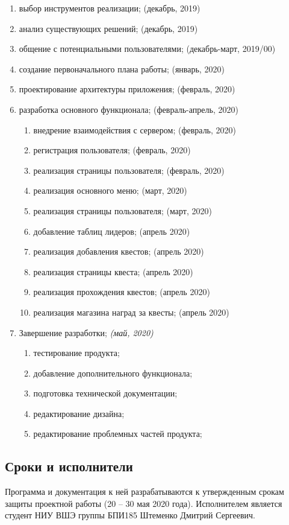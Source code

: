 \begin{enumerate}[I.]
\begin{enumerate}[1.]
		\begin{enumerate}[1.]
			\item выбор инструментов реализации; (декабрь, 2019)
			\item анализ существующих решений; (декабрь, 2019)
			\item общение с потенциальными пользователями; (декабрь-март, 2019/00)
			\item создание первоначального плана работы; (январь, 2020)
			\item проектирование архитектуры приложения; (февраль, 2020)
			\item разработка основного функционала; (февраль-апрель, 2020)
			\begin{enumerate}
				\item внедрение взаимодействия с сервером; (февраль, 2020)
				\item регистрация пользователя; (февраль, 2020)
				\item реализация страницы пользователя; (февраль, 2020)
				\item реализация основного меню; (март, 2020)
				\item реализация страницы пользователя; (март, 2020)
				\item добавление таблиц лидеров; (апрель 2020)
				\item реализация добавления квестов; (апрель 2020)
				\item реализация страницы квеста; (апрель 2020) 
				\item реализация прохождения квестов; (апрель 2020)
				\item реализация магазина наград за квесты; (апрель 2020)
			\end{enumerate}
			\item Завершение разработки; \textit{(май, 2020)}
			\begin{enumerate}
				\item тестирование продукта;
				\item добавление дополнительного функционала;
				\item подготовка технической документации;
				\item редактирование дизайна;
				\item редактирование проблемных частей продукта;
			\end{enumerate}
		\end{enumerate}
		
	\end{enumerate}
\end{enumerate}


\subsection{Сроки и исполнители}

\hspace{10mm} Программа и документация к ней разрабатываются к утвержденным срокам защиты
проектной работы (20 – 30 мая 2020 года). Исполнителем является студент НИУ ВШЭ
группы БПИ185 Штеменко Дмитрий Сергеевич.